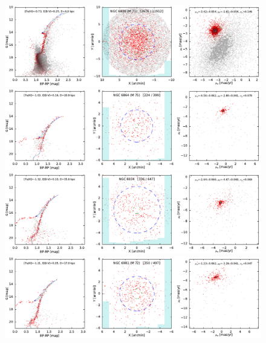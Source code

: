 \documentclass[usenatbib]{mnras}
\begin{document}
\clearpage\begin{figure}
\contcaption{}
\includegraphics{figs/NGC_6838_M_71.pdf}
\includegraphics{figs/NGC_6864_M_75.pdf}
\includegraphics{figs/NGC_6934.pdf}
\includegraphics{figs/NGC_6981_M_72.pdf}
\end{figure}
\end{document}
